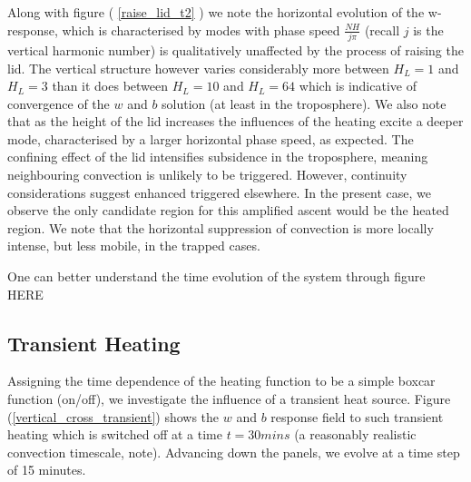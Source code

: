 \documentclass[a4paper,10pt]{article}
\begin{document}

Along with figure (  \ref{raise_lid_t2} ) we note the horizontal evolution of the w-response, which
is characterised by modes with phase speed $\frac{N H}{j \pi}$ (recall $j$ is the vertical
harmonic number) is qualitatively unaffected by the process of raising the lid. The vertical
structure however varies considerably more between $H_L = 1$ and  $H_L = 3$ than it does between
$H_L = 10$ and $H_L = 64$ which is indicative of convergence of the $w$ and $b$ solution (at least
in the troposphere). We also note that as the height of the lid increases the influences of
the heating excite a deeper mode, characterised by a larger horizontal phase speed, as
expected. The confining effect of the lid intensifies subsidence in the troposphere, meaning
neighbouring convection is unlikely to be triggered. However, continuity considerations suggest
enhanced triggered elsewhere. In the present case, we
observe the only candidate region for this amplified ascent would be the heated region. We note that
the horizontal suppression of convection is more locally intense, but less mobile, in the trapped
cases.

One can better understand the time evolution of the system through figure HERE

\subsection{Transient Heating}
Assigning the time dependence of the heating function to be a simple boxcar function (on/off), we
investigate the influence of a transient heat source. Figure
(\ref{vertical_cross_transient}) shows the $w$ and $b$ response
field to such transient heating which is switched off at a time $t = 30mins$ (a reasonably
realistic convection timescale, note). Advancing down the panels, we evolve at a time step of 15
minutes.
\end{document}
